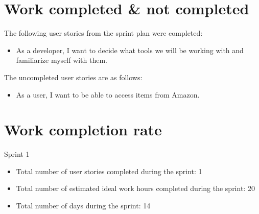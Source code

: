 \documentclass[11pt]{article}
\begin{document}
	\section{Work completed \& not completed}
		\vspace{-3mm}
		\normalsize{The following user stories from the sprint plan were completed:}\\
		\vspace{-3mm}
		\begin{itemize}
			\item As a developer, I want to decide what tools we will be working with and familiarize myself with them.
		\end{itemize}
		\vspace{-3mm}
		\normalsize{The uncompleted user stories are as follows:}\\
		\vspace{-3mm}
		\begin{itemize}		
			\item As a user, I want to be able to access items from Amazon.
		\end{itemize}
		\vspace{-3mm}
		
	\section{Work completion rate}
		\vspace{-3mm}
		\normalsize{Sprint 1}\\
		\vspace{-3mm}
		\begin{itemize}
			\item Total number of user stories completed during the sprint: 1
			\vspace{-3mm}
			\item Total number of estimated ideal work hours completed during the sprint: 20
			\vspace{-3mm}
			\item Total number of days during the sprint: 14
		\end{itemize}
	
\end{document}
